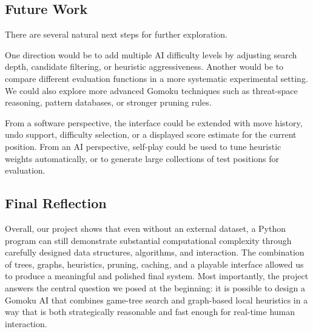\documentclass[11pt]{article}
\begin{document}
\subsection*{Future Work}

There are several natural next steps for further exploration.

One direction would be to add multiple AI difficulty levels by adjusting search depth, candidate filtering, or heuristic aggressiveness. Another would be to compare different evaluation functions in a more systematic experimental setting. We could also explore more advanced Gomoku techniques such as threat-space reasoning, pattern databases, or stronger pruning rules.

From a software perspective, the interface could be extended with move history, undo support, difficulty selection, or a displayed score estimate for the current position. From an AI perspective, self-play could be used to tune heuristic weights automatically, or to generate large collections of test positions for evaluation.

\subsection*{Final Reflection}

Overall, our project shows that even without an external dataset, a Python program can still demonstrate substantial computational complexity through carefully designed data structures, algorithms, and interaction. The combination of trees, graphs, heuristics, pruning, caching, and a playable interface allowed us to produce a meaningful and polished final system. Most importantly, the project answers the central question we posed at the beginning: it is possible to design a Gomoku AI that combines game-tree search and graph-based local heuristics in a way that is both strategically reasonable and fast enough for real-time human interaction.
\end{document}
